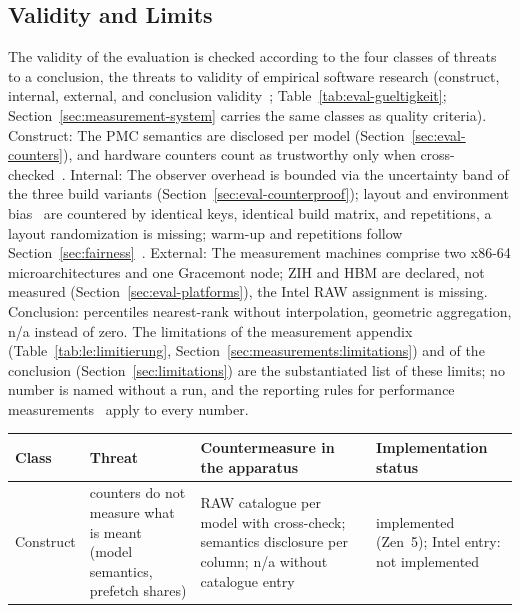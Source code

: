 \begin{nurkurz}
\subsection{Validity and Limits}\label{sec:eval-validity}
The validity of the evaluation is checked according to the four classes of threats to a conclusion, the
threats to validity of empirical software research (construct, internal, external, and conclusion
validity~\cite{wohlin2012experimentation}; Table~\ref{tab:eval-gueltigkeit};
Section~\ref{sec:measurement-system} carries the same classes as quality criteria). Construct: The PMC
semantics are disclosed per model (Section~\ref{sec:eval-counters}), and hardware counters count as
trustworthy only when cross-checked~\cite{weaver2008counters}. Internal: The observer overhead is bounded
via the uncertainty band of the three build variants (Section~\ref{sec:eval-counterproof}); layout and
environment bias~\cite{mytkowicz2009wrongdata,curtsinger2013stabilizer} are countered by identical keys,
identical build matrix, and repetitions, a layout randomization is missing; warm-up and repetitions follow
Section~\ref{sec:fairness}~\cite{kalibera2013rigorous}. External: The measurement machines comprise two
x86-64 microarchitectures and one Gracemont node; ZIH and HBM are declared, not measured
(Section~\ref{sec:eval-platforms}), the Intel RAW assignment is missing. Conclusion: percentiles
nearest-rank without interpolation, geometric aggregation, n/a instead of zero. The limitations of the
measurement appendix (Table~\ref{tab:le:limitierung}, Section~\ref{sec:measurements:limitations}) and of the
conclusion (Section~\ref{sec:limitations}) are the substantiated list of these limits; no number is named
without a run, and the reporting rules for performance
measurements~\cite{hoefler2015benchmarking,blackburn2016truth} apply to every number.
\begin{table}[htbp]\centering\footnotesize
\begin{tabular}{@{}>{\raggedright\arraybackslash}p{1.6cm}>{\raggedright\arraybackslash}p{4.0cm}>{\raggedright\arraybackslash}p{4.9cm}>{\raggedright\arraybackslash}p{3.7cm}@{}}
\toprule
Class & Threat & Countermeasure in the apparatus & Implementation status \\
\midrule
Construct & counters do not measure what is meant (model semantics, prefetch shares) & RAW catalogue per model with cross-check; semantics disclosure per column; n/a without catalogue entry & implemented (Zen~5); Intel entry: not implemented \\

\end{tabular}
\end{table}
\end{nurkurz}
